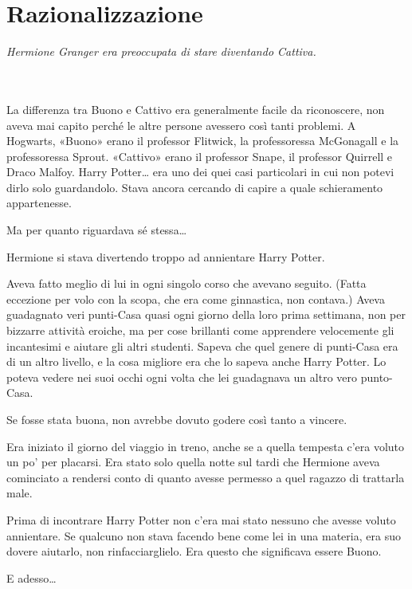 
\chapter{Razionalizzazione}
\label{capitolo:21}

\emph{Hermione Granger era preoccupata di stare diventando Cattiva.}

~\\
~\\

La differenza tra Buono e Cattivo era generalmente facile da riconoscere, non aveva mai capito perché le altre persone avessero così tanti problemi. A Hogwarts, «Buono» erano il professor Flitwick, la professoressa McGonagall e la professoressa Sprout. «Cattivo» erano il professor Snape, il professor Quirrell e Draco Malfoy. Harry Potter… era uno dei quei casi particolari in cui non potevi dirlo solo guardandolo. Stava ancora cercando di capire a quale schieramento appartenesse.

Ma per quanto riguardava sé stessa…

Hermione si stava divertendo troppo ad annientare Harry Potter.

Aveva fatto meglio di lui in ogni singolo corso che avevano seguito. (Fatta eccezione per volo con la scopa, che era come ginnastica, non contava.) Aveva guadagnato veri punti-Casa quasi ogni giorno della loro prima settimana, non per bizzarre attività eroiche, ma per cose brillanti come apprendere velocemente gli incantesimi e aiutare gli altri studenti. Sapeva che quel genere di punti-Casa era di un altro livello, e la cosa migliore era che lo sapeva anche Harry Potter. Lo poteva vedere nei suoi occhi ogni volta che lei guadagnava un altro vero punto-Casa.

Se fosse stata buona, non avrebbe dovuto godere così tanto a vincere.

Era iniziato il giorno del viaggio in treno, anche se a quella tempesta c’era voluto un po’ per placarsi. Era stato solo quella notte sul tardi che Hermione aveva cominciato a rendersi conto di quanto avesse permesso a quel ragazzo di trattarla male.

Prima di incontrare Harry Potter non c’era mai stato nessuno che avesse voluto annientare. Se qualcuno non stava facendo bene come lei in una materia, era suo dovere aiutarlo, non rinfacciarglielo. Era questo che significava essere Buono.

E adesso…

